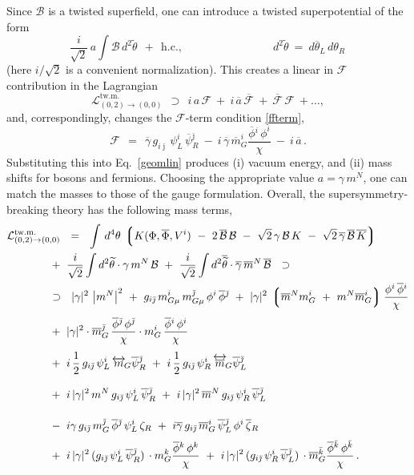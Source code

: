 \documentclass[12pt]{article}
\newcommand{\wt}{\widetilde}
\newcommand{\ov}{\overline}
\newcommand{\mc}[1]{\mathcal{#1}}
\newcommand{\lgr}{\left\lgroup}
\newcommand{\rgr}{\right\rgroup}
\newcommand{\bzr}{\ov{\zeta}{}_R}
\newcommand{\zr}{\zeta_R}
\newcommand{\bgamma}{\ov{\gamma}}
\newcommand{\bpsi}{\ov{\psi}{}}
\newcommand{\bphi}{\ov{\phi}{}}
\newcommand{\ff}{\mc{F}}
\newcommand{\bff}{\ov{\mc{F}}}
\newcommand{\bj}{{\bar \jmath}}
\newcommand{\bk}{{\bar k}}
\begin{document}
	Since $ \mc{B} $ is a twisted superfield, one can introduce a twisted superpotential of the form
\[
	\frac{i}{\sqrt{2}}\,a \int \mc{B}\, d^2\wt{\theta} ~~+~~ \text{h.c.},
	\qquad\qquad\qquad\qquad d^2\wt{\theta} ~=~ d\ov{\theta}{}_L\,d\theta_R\,
\]
	(here $ i/\sqrt{2} $ is a convenient normalization).
	This creates a linear in $ \ff $ contribution in the Lagrangian
\[
	\mc{L}_{(0,2)\to(0,0)}^\text{tw.m.} ~~\supset~~ i\,a\,\ff ~+~ i\,\ov{a}\,\bff ~+~ \bff\,\ff ~+ \dots,
\]
	and, correspondingly, changes the $ \ff $-term condition \eqref{ffterm},
\[
	\ff ~~=~~ \bgamma\, g_{i\bj}\, \psi_L^i\, \bpsi_R^\bj 
		~-~ i\, \bgamma\, \ov{m}_G^i \frac{\bphi^i\, \phi^i}{\chi}
		~-~ i\, \ov{a}\,.
\]
	Substituting this into Eq.~\eqref{geomlin} produces (i) vacuum energy, and (ii) mass shifts for
	bosons and fermions.
	Choosing the appropriate value $ a = \gamma\,m^N $, one can match the masses to those of the
	gauge formulation.
	Overall, the supersymmetry-breaking theory has the following mass terms,
\begin{align}
%
\notag
	\mc{L}_{(0,2)\to(0,0)}^\text{tw.m.} & 
	~~=~~ \int\, d^4\theta\, \lgr K(\Phi,\ov{\Phi}, V^i) 
		~-~ 2\, \ov{\mc{B}}\,\mc{B}  
		~-~  \sqrt{2}\, \gamma\,\mc{B}\,K  ~-~ \sqrt{2}\, \ov{\gamma}\,\ov{\mc{B}}\,\ov{K} \rgr
	\\
%
\notag
	&\!\!\!\!\!\!\!\!
	~+~ \frac{i}{\sqrt{2}} \int d^2\wt{\theta} \cdot \gamma\,m^N\,\mc{B} 
	~+~ \frac{i}{\sqrt{2}} \int d^2\ov{\wt{\theta}} \cdot \bgamma\, \ov{m}{}^N\, \ov{\mc{B}}
	~~\supset~~
	\\
%
\notag
	&\!\!\!\!\!\!\!\!
	~\supset~~
	|\gamma|^2\, \left|m^N\right|^2 
	~+~ g_{i\bj}\, m_{G\mu}^i\, m_{G\mu}^\bj\, \phi^i\, \bphi^\bj
	~+~ |\gamma|^2\, \lgr \ov{m}{}^N m_G^i ~+~ m^N \ov{m}{}_G^i \rgr \frac {\phi^i\,\bphi^i}{\chi}
	\\[1mm]
%
\label{geom_mass}
	&\!\!\!\!\!\!\!\!
	~+~ |\gamma|^2 \cdot \ov{m}{}_G^\bj\,\frac{\bphi^\bj\,\phi^\bj}{\chi}
			\cdot m_G^i\, \frac{\bphi^i\, \phi^i}{\chi}
	\\[1mm]
%
\notag
	&\!\!\!\!\!\!\!\!
	~+~ i\,\frac{1}{2}\,g_{i\bj}\,\psi_L^i\, \overleftrightarrow{m}{}_{\!G} \bpsi_R^\bj
	~+~ i\,\frac{1}{2}\,g_{i\bj}\,\psi_R^i\, \overleftrightarrow{\ov{m}}{}_{\!G} \bpsi_L^\bj
	\\[3mm]
%
\notag
	&\!\!\!\!\!\!\!\!
	~+~ i\,|\gamma|^2\,m^N\,g_{i\bj}\,\psi_L^i\, \bpsi_R^\bj
	~+~ i\,|\gamma|^2\,\ov{m}{}^N\,g_{i\bj}\,\psi_R^i\, \bpsi_L^\bj
	\\[4mm]
%
\notag
	&\!\!\!\!\!\!\!\!
	~-~ i\gamma\, g_{i\bj}\, m_G^\bj\,\bphi^\bj\, \psi_L^i\,\zr
	~+~ i\bgamma\, g_{i\bj}\,\ov{m}{}_G^i\, \bpsi_L^\bj\, \phi^i\,\bzr
	\\[1mm]
%
\notag
	&\!\!\!\!\!\!\!\!
	~+~ i\, |\gamma|^2\, (g_{i\bj}\,\psi_L^i\,\bpsi_R^\bj)\, \cdot m_G^k \frac{\bphi^k\, \phi^k}{\chi}
	~+~ i\, |\gamma|^2\, (g_{i\bj}\,\psi_R^i\,\bpsi_L^\bj)\, \cdot \ov{m}{}_G^\bk \frac{\bphi^\bk\,\phi^\bk}{\chi}
	\,.
\end{align}
	
\end{document}
